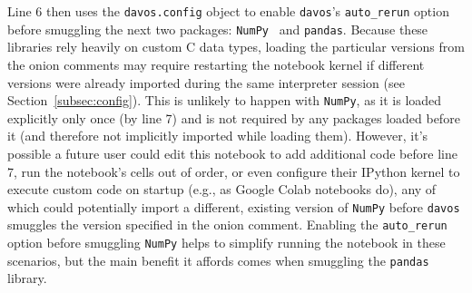 \documentclass[preprint,12pt,a4paper]{elsarticle}
\begin{document}
Line 6 then uses the \texttt{davos.config} object to enable \texttt{davos}'s \texttt{auto\_rerun} option before smuggling the next two packages: \texttt{NumPy}~\cite{HarrEtal20} and \texttt{pandas}. Because these libraries rely heavily on custom C data types, loading the particular versions from the onion comments may require restarting the notebook kernel if different versions were already imported during the same interpreter session (see Section~\ref{subsec:config}). This is unlikely to happen with \texttt{NumPy}, as it is loaded explicitly only once (by line 7) and is not required by any packages loaded before it (and therefore not implicitly imported while loading them). However, it's possible a future user could edit this notebook to add additional code before line 7, run the notebook's cells out of order, or even configure their IPython kernel to execute custom code on startup (e.g., as Google Colab notebooks do), any of which could potentially import a different, existing version of \texttt{NumPy} before \texttt{davos} smuggles the version specified in the onion comment. Enabling the \texttt{auto\_rerun} option before smuggling \texttt{NumPy} helps to simplify running the notebook in these scenarios, but the main benefit it affords comes when smuggling the \texttt{pandas} library.
\end{document}
